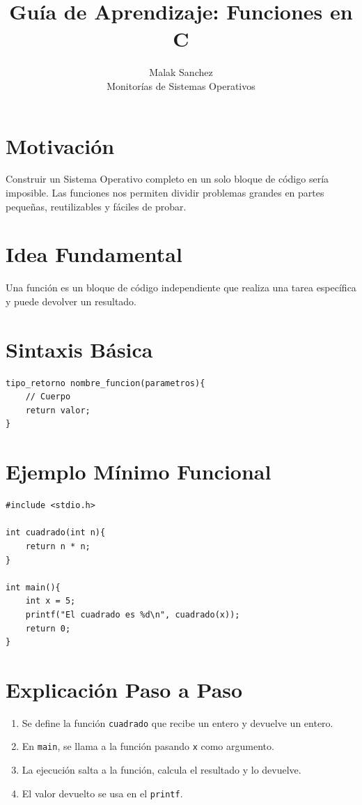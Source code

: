 \documentclass[12pt,a4paper]{article}
\title{\textbf{Guía de Aprendizaje: Funciones en C}}
\author{Malak Sanchez \\ \small Monitorías de Sistemas Operativos}
\date{}
\begin{document}
\maketitle

\section{Motivación}
Construir un Sistema Operativo completo en un solo bloque de código sería imposible. Las funciones nos permiten dividir problemas grandes en partes pequeñas, reutilizables y fáciles de probar.

\section{Idea Fundamental}
Una función es un bloque de código independiente que realiza una tarea específica y puede devolver un resultado.

\section{Sintaxis Básica}
\begin{lstlisting}[numbers=none]
tipo_retorno nombre_funcion(parametros){
    // Cuerpo
    return valor;
}
\end{lstlisting}

\section{Ejemplo Mínimo Funcional}
\begin{lstlisting}
#include <stdio.h>

int cuadrado(int n){
    return n * n;
}

int main(){
    int x = 5;
    printf("El cuadrado es %d\n", cuadrado(x));
    return 0;
}
\end{lstlisting}

\section{Explicación Paso a Paso}
\begin{enumerate}
    \item Se define la función \texttt{cuadrado} que recibe un entero y devuelve un entero.
    \item En \texttt{main}, se llama a la función pasando \texttt{x} como argumento.
    \item La ejecución salta a la función, calcula el resultado y lo devuelve.
    \item El valor devuelto se usa en el \texttt{printf}.
\end{enumerate}
\end{document}
